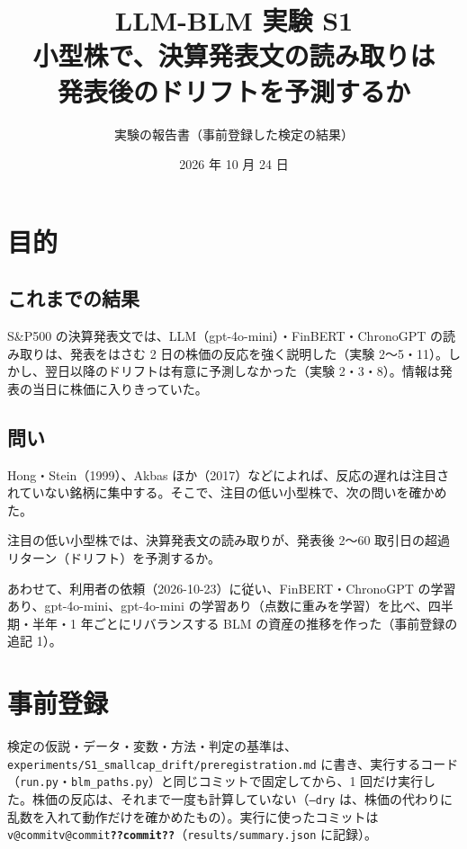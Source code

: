 \documentclass[xelatex,ja=standard,jafont=haranoaji,a4paper,10pt,openany]{bxjsreport}
\title{LLM-BLM 実験 S1\\[6pt]
  \large 小型株で、決算発表文の読み取りは\\発表後のドリフトを予測するか}
\author{実験の報告書（事前登録した検定の結果）}
\date{2026 年 10 月 24 日}
\makeatletter
\newcommand{\V}[1]{\ifcsname v@#1\endcsname\csname v@#1\endcsname\else\textbf{??#1??}\fi}
\newcommand{\code}[1]{\texttt{#1}}
\newcommand{\SP}{S\&P500}
\makeatother
\begin{document}
\maketitle



\setcounter{tocdepth}{1}
{\small\tableofcontents}

\chapter{目的}\label{ch:purpose}

\section{これまでの結果}

\SP{} の決算発表文では、LLM（gpt-4o-mini）・FinBERT・ChronoGPT の読み取りは、発表をはさむ 2 日の株価の反応を強く説明した（実験 2〜5・11）。しかし、翌日以降のドリフトは有意に予測しなかった（実験 2・3・8）。情報は発表の当日に株価に入りきっていた。

\section{問い}

Hong・Stein（1999）、Akbas ほか（2017）などによれば、反応の遅れは注目されていない銘柄に集中する。そこで、注目の低い小型株で、次の問いを確かめた。

\begin{keybox}[問い]
注目の低い小型株では、決算発表文の読み取りが、発表後 2〜60 取引日の超過リターン（ドリフト）を予測するか。
\end{keybox}

あわせて、利用者の依頼（2026-10-23）に従い、FinBERT・ChronoGPT の学習あり、gpt-4o-mini、gpt-4o-mini の学習あり（点数に重みを学習）を比べ、四半期・半年・1 年ごとにリバランスする BLM の資産の推移を作った（事前登録の追記 1）。

\chapter{事前登録}\label{ch:prereg}

検定の仮説・データ・変数・方法・判定の基準は、\code{experiments/S1\_smallcap\_drift/preregistration.md} に書き、実行するコード（\code{run.py}・\code{blm\_paths.py}）と同じコミットで固定してから、1 回だけ実行した。株価の反応は、それまで一度も計算していない（\code{--dry} は、株価の代わりに乱数を入れて動作だけを確かめたもの）。実行に使ったコミットは \code{\V{commit}}（\code{results/summary.json} に記録）。
\end{document}
